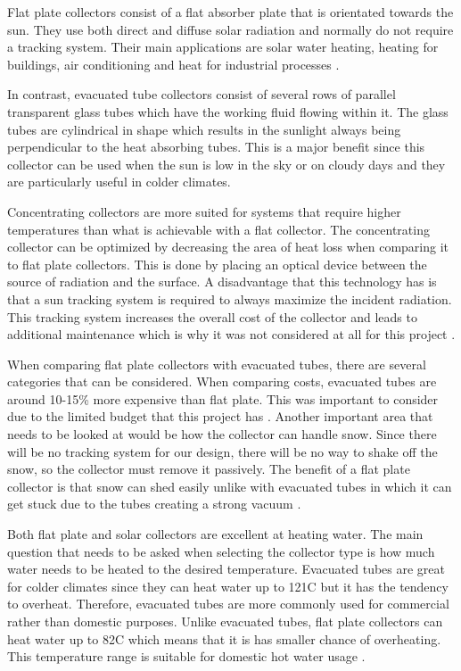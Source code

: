 \medskip
Flat plate collectors consist of a flat absorber plate that is orientated towards the sun. They use both direct and diffuse solar radiation and normally do not require a tracking system. Their main applications are solar water heating, heating for buildings, air conditioning and heat for industrial processes \cite{solar_thermal_energy}.

\medskip
In contrast, evacuated tube collectors consist of several rows of parallel transparent glass tubes which have the working fluid flowing within it. The glass tubes are cylindrical in shape which results in the sunlight always being perpendicular to the heat absorbing tubes. This is a major benefit since this collector can be used when the sun is low in the sky or on cloudy days and they are particularly useful in colder climates.

\medskip
Concentrating collectors are more suited for systems that require higher temperatures than what is achievable with a flat collector. The concentrating collector can be optimized by decreasing the area of heat loss when comparing it to flat plate collectors. This is done by placing an optical device between the source of radiation and the surface. A disadvantage that this technology has is that a sun tracking system is required to always maximize the incident radiation. This tracking system increases the overall cost of the collector and leads to additional maintenance which is why it was not considered at all for this project \cite{solar_thermal_energy}.

\medskip
When comparing flat plate collectors with evacuated tubes, there are several categories that can be considered. When comparing costs, evacuated tubes are around 10-15\% more expensive than flat plate. This was important to consider due to the limited budget that this project has \cite{flat_plate}. Another important area that needs to be looked at would be how the collector can handle snow. Since there will be no tracking system for our design, there will be no way to shake off the snow, so the collector must remove it passively. The benefit of a flat plate collector is that snow can shed easily unlike with evacuated tubes in which it can get stuck due to the tubes creating a strong vacuum \cite{flat_plate}.

\medskip
Both flat plate and solar collectors are excellent at heating water. The main question that needs to be asked when selecting the collector type is how much water needs to be heated to the desired temperature. Evacuated tubes are great for colder climates since they can heat water up to 121\textdegree C but it has the tendency to overheat. Therefore, evacuated tubes are more commonly used for commercial rather than domestic purposes. Unlike evacuated tubes, flat plate collectors can heat water up to 82\textdegree C which means that it is has smaller chance of overheating. This temperature range is suitable for domestic hot water usage \cite{flat_plate}.

